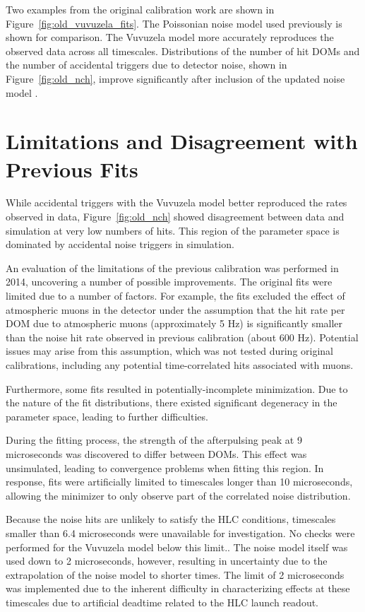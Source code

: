Two examples from the original calibration work are shown in Figure~\ref{fig:old_vuvuzela_fits}.
The Poissonian noise model used previously is shown for comparison.
The Vuvuzela model more accurately reproduces the observed data across all timescales.
Distributions of the number of hit DOMs and the number of accidental triggers due to detector noise, shown in Figure~\ref{fig:old_nch}, improve significantly after inclusion of the updated noise model \cite{Thesis-Vuvuzela}.

\label{sec:vuvuzela_limitations}
\section{Limitations and Disagreement with Previous Fits}
While accidental triggers with the Vuvuzela model better reproduced the rates observed in data, Figure~\ref{fig:old_nch} showed disagreement between data and simulation at very low numbers of hits.
This region of the parameter space is dominated by accidental noise triggers in simulation.

An evaluation of the limitations of the previous calibration was performed in 2014, uncovering a number of possible improvements.
The original fits were limited due to a number of factors. 
For example, the fits excluded the effect of atmospheric muons in the detector under the assumption that the hit rate per DOM due to atmospheric muons (approximately 5 Hz) is significantly smaller than the noise hit rate observed in previous calibration (about 600 Hz).
Potential issues may arise from this assumption, which was not tested during original calibrations, including any potential time-correlated hits associated with muons.

Furthermore, some fits resulted in potentially-incomplete minimization.
Due to the nature of the fit distributions, there existed significant degeneracy in the parameter space, leading to further difficulties.

During the fitting process, the strength of the afterpulsing peak at 9 microseconds was discovered to differ between DOMs.
This effect was unsimulated, leading to convergence problems when fitting this region.
In response, fits were artificially limited to timescales longer than 10 microseconds, allowing the minimizer to only observe part of the correlated noise distribution.

Because the noise hits are unlikely to satisfy the HLC conditions, timescales smaller than 6.4 microseconds were unavailable for investigation.
No checks were performed for the Vuvuzela model below this limit..
The noise model itself was used down to 2 microseconds, however, resulting in uncertainty due to the extrapolation of the noise model to shorter times.
The limit of 2 microseconds was implemented due to the inherent difficulty in characterizing effects at these timescales due to artificial deadtime related to the HLC launch readout. 

